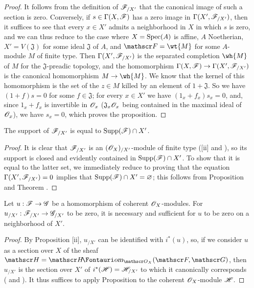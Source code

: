 \begin{proof}
\label{proof-1.10.8.11}
It follows from the definition of $\mathscr{F}_{/X'}$ that the canonical image of such a section is zero.
Conversely, if $s\in\Gamma(X,\mathscr{F})$ has a zero image in $\Gamma(X',\mathscr{F}_{/X'})$, then it suffices to see that every $x\in X'$ admits a neighborhood in $X$ in which $s$ is zero, and we can thus reduce to the case where $X=\operatorname{Spec}(A)$ is affine, $A$ Noetherian, $X'=V(\mathfrak{J})$ for some ideal $\mathfrak{J}$ of $A$, and $\sh{F}=\wt{M}$ for some $A$-module $M$ of finite type.
Then $\Gamma(X',\mathscr{F}_{/X'})$ is the separated completion $\wh{M}$ of $M$ for the $\mathfrak{J}$-preadic topology, and the homomorphism $\Gamma(X,\sh{F})\to\Gamma(X',\sh{F}_{/X'})$ is the canonical homomorphism $M\to\wh{M}$.
We know  that the kernel of this homomorphism is the set of the $z\in M$ killed by an element of $1+\mathfrak{J}$.
So we have $(1+f)s=0$ for some $f\in\mathfrak{J}$; for every $x\in X'$ we have $(1_x+f_x)s_x=0$, and, since $1_x+f_x$ is invertible in $\mathscr{O}_x$ ($\mathfrak{J}_x\mathscr{O}_x$ being contained in the maximal ideal of $\mathscr{O}_x$), we have $s_x=0$, which proves the proposition.
\end{proof}

\begin{corollary}[10.8.12]
\label{1.10.8.12}
The support of $\mathscr{F}_{/X'}$ is equal to $\operatorname{Supp}(\mathscr{F})\cap X'$.
\end{corollary}

\begin{proof}
\label{proof-1.10.8.12}
It is clear that $\mathscr{F}_{/X'}$ is an $(\mathscr{O}_X)_{/X'}$-module of finite type ([ii] and ),
so its support is closed  and evidently contained in $\operatorname{Supp}(\mathscr{F})\cap X'$.
To show that it is equal to the latter set, we immediately reduce to proving that the equation $\Gamma(X',\mathscr{F}_{/X'})=0$ implies that $\operatorname{Supp}(\mathscr{F})\cap X'=\varnothing$; this follows from Proposition  and Theorem .
\end{proof}

\begin{corollary}[10.8.13]
\label{1.10.8.13}
Let $u:\sh{F}\to\sh{G}$ be a homomorphism of coherent $\mathscr{O}_X$-modules.
For $u_{/X'}:\sh{F}_{/X'}\to\sh{G}_{/X'}$ to be zero, it is necessary and sufficient for $u$ to be zero on a neighborhood of $X'$.
\end{corollary}

\begin{proof}
\label{proof-1.10.8.13}
By Proposition [ii], $u_{/X'}$ can be identified with $i^*(u)$, so, if we consider $u$ as a section over $X$ of the sheaf $\sh{H}=\shHom_{\sh{O}_X}(\sh{F},\sh{G})$, then $u_{/X'}$ is the section over $X'$ of $i^*(\mathscr{H})=\mathscr{H}_{/X'}$ to which it canonically corresponds ( and ).
It thus suffices to apply Proposition  to the coherent $\mathscr{O}_X$-module $\mathscr{H}$.
\end{proof}

